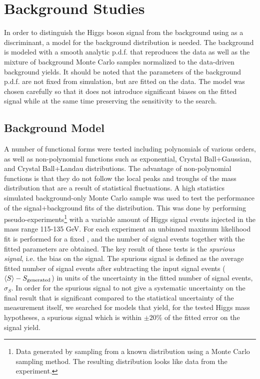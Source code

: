 \section{Background Studies}
 \label{sec:background}
In order to distinguish the Higgs boson signal from the background using \dm
as a discriminant, a model for the background distribution is needed. The background
is modeled with a smooth analytic p.d.f. that reproduces the data as well as the 
mixture of background Monte Carlo samples normalized to the data-driven background 
yields. It should be noted that the parameters of the background p.d.f. are not fixed
from simulation, but are fitted on the data. The model was chosen carefully so that
it does not introduce significant biases on the fitted signal while at the same
time preserving the sensitivity to the search.

\subsection{Background Model}
A number of functional forms were tested including polynomials of various orders,
as well as non-polynomial functions such as exponential, Crystal Ball+Gaussian,
and Crystal Ball+Landau distributions. The advantage of non-polynomial functions
is that they do not follow the local peaks and troughs of the mass distribution 
that are a result of statistical fluctuations. A high statistics simulated
background-only Monte Carlo sample was used to test the performance of the
signal+background fits of the \dm distribution. This was done by performing
pseudo-experiments\footnote{Data generated by sampling from a known distribution
using a Monte Carlo sampling method. 
The resulting distribution looks like data from the experiment.} 
with a variable amount of Higgs signal events injected in
the mass range 115-135 GeV. For each experiment an unbinned maximum likelihood
fit is performed for a fixed \mllg, and the number of signal events together
with the fitted parameters are obtained. The key result of these tests is
the \emph{spurious signal}, i.e. the bias on the signal. The spurious signal
is defined as the average fitted number of signal events after subtracting
the input signal events ($\langle S\rangle - S_{\text{generated}}$) in units of the
uncertainty in the fitted number of signal events, $\sigma_S$. In order for the
spurious signal to not give a systematic uncertainty on the final result
that is significant compared to the statistical uncertainty of the measurement
itself, we searched for models that yield, for the tested Higgs mass hypotheses,
a spurious signal which is within $\pm20\%$ of the fitted error on the signal yield.

